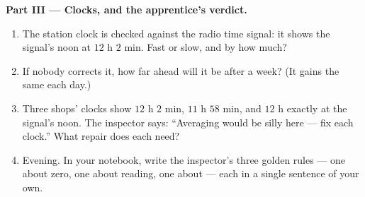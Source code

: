 \begin{problem}
\medskip\noindent\textbf{Part III --- Clocks, and the apprentice's
verdict.}
\begin{enumerate}[resume]
  \item The station clock is checked against the radio time
        signal: it shows the signal's noon at $12$ h $2$ min. Fast
        or slow, and by how much?
  \item If nobody corrects it, how far ahead will it be after a
        week? (It gains the same each day.)
  \item Three shops' clocks show $12$ h $2$ min, $11$ h $58$ min,
        and $12$ h exactly at the signal's noon. The inspector
        says: ``Averaging would be silly here --- fix each
        clock.'' What repair does each need?
  \item Evening. In your notebook, write the inspector's three
        golden rules --- one about zero, one about reading, one
        about  --- each in a single sentence of your own.
\end{enumerate}
\end{problem}
